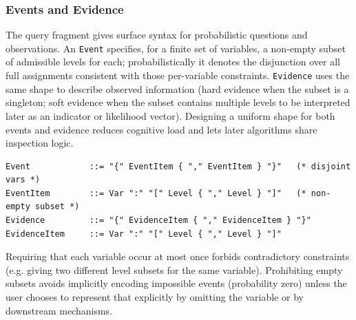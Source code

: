 \documentclass[11pt]{article}
\begin{document}
\subsubsection{Events and Evidence}
The query fragment gives surface syntax for probabilistic questions and observations. An \texttt{Event} specifies, for a finite set of variables, a non-empty subset of admissible levels for each; probabilistically it denotes the disjunction over all full assignments consistent with those per-variable constraints. \texttt{Evidence} uses the same shape to describe observed information (hard evidence when the subset is a singleton; soft evidence when the subset contains multiple levels to be interpreted later as an indicator or likelihood vector). Designing a uniform shape for both events and evidence reduces cognitive load and lets later algorithms share inspection logic.
\begin{lstlisting}[language=EBNF]
Event            ::= "{" EventItem { "," EventItem } "}"   (* disjoint vars *)
EventItem        ::= Var ":" "[" Level { "," Level } "]"   (* non-empty subset *)
Evidence         ::= "{" EvidenceItem { "," EvidenceItem } "}"
EvidenceItem     ::= Var ":" "[" Level { "," Level } "]"
\end{lstlisting}
Requiring that each variable occur at most once forbids contradictory constraints (e.g. giving two different level subsets for the same variable). Prohibiting empty subsets avoids implicitly encoding impossible events (probability zero) unless the user chooses to represent that explicitly by omitting the variable or by downstream mechanisms.
\end{document}
